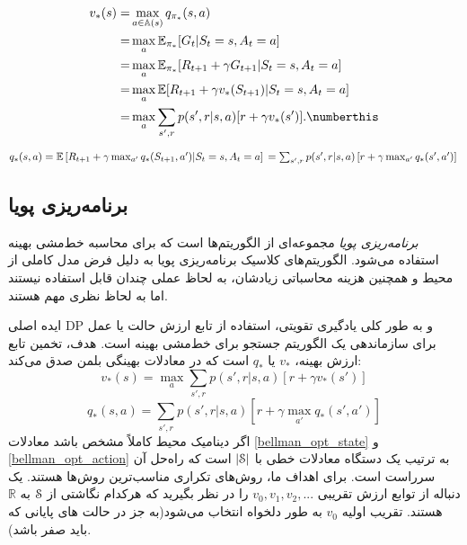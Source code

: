 \begin{align}
  v_{*}(s)= &\max_{a \in \mathbb{A}(s)} q_{\pi_*}(s,a) \nonumber \\
      =& \max_{a} \mathbb{E}_{\pi_*} [G_t|S_t=s, A_t=a] \nonumber \\ 
      =& \max_{a} \mathbb{E}_{\pi_*} [R_{t+1} + \gamma G_{t+1} | S_t=s, A_t=a] \nonumber \\ 
      =& \max_{a} \mathbb{E} [R_{t+1} + \gamma v_*(S_{t+1}) | S_t= s, A_t = a] \nonumber \\
      =& \max_{a} \sum_{s',r} p(s',r|s,a) [r + \gamma v_*(s')]. \numberthis
\label{eq:bellman-opti}
\end{align}




$q_*(s,a) = \mathbb{E}\left[R_{t+1} + \gamma \max_{a'} q_*(S_{t+1},a')| S_t=s, A_t=a \right] \\
= \sum_{s',r} p(s',r|s,a) \left[r + \gamma \max_{a'} q_*(s',a')\right] \\
$
\subsection{برنامه‌ریزی پویا}
\textit{برنامه‌ریزی پویا}   مجموعه‌ای از الگوریتم‌ها است که برای محاسبه خط‌مشی بهینه استفاده می‌شود.
الگوریتم‌های کلاسیک برنامه‌ریزی پویا به دلیل فرض
مدل کاملی از محیط و همچنین هزینه محاسباتی زیادشان، به لحاظ عملی چندان قابل استفاده نیستند اما به لحاظ نظری مهم هستند.

ایده اصلی DP و به طور کلی یادگیری تقویتی‌، استفاده از تابع ارزش حالت یا عمل برای سازماندهی یک الگوریتم جستجو برای خط‌مشی بهینه است.
هدف، تخمین تابع ارزش بهینه،
$v_*$
یا
$q_*$
است
که در معادلات بهینگی بلمن صدق می‌کند:
\begin{equation}
v_{*}(s) = \max_{a} \sum_{s',r} p(s',r | s,a)[r + \gamma v_*(s')]
\label{bellman_opt_state}
\end{equation}
\begin{equation}
q_{*}(s,a) = \sum_{s',r} p(s',r | s,a)[r + \gamma \max_{a'} q_* (s',a')]
\label{bellman_opt_action}
\end{equation}
اگر دینامیک محیط کاملاً مشخص باشد معادلات 
\ref{bellman_opt_state}
و
\ref{bellman_opt_action}
به ترتیب یک دستگاه معادلات خطی با
 $|\EuScript{S}|$
  است
 که راه‌حل آن سرراست است.
 برای اهداف ما، روش‌های تکراری مناسب‌ترین روش‌ها هستند. یک دنباله 
از توابع ارزش تقریبی
$ v_0 , v_1 , v_2 , ...$ 
را در نظر بگیرید که هرکدام نگاشتی از
$\EuScript{S}$ 
به 
$\mathbb{R}$
 هستند.
تقریب اولیه $v_0$
به طور دلخواه انتخاب می‌شود(به جز در حالت های پایانی که باید صفر باشد).

